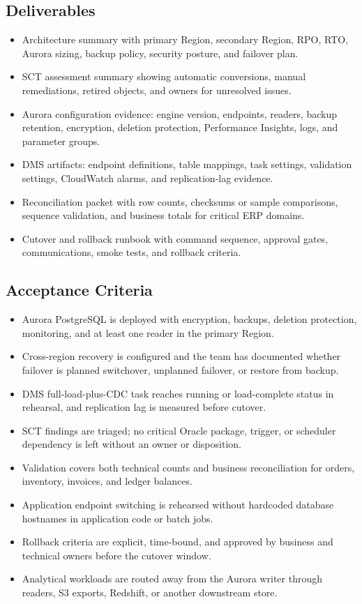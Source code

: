 \subsection*{Deliverables}
\begin{itemize}
    \item Architecture summary with primary Region, secondary Region, RPO, RTO, Aurora sizing, backup policy, security posture, and failover plan.
    \item SCT assessment summary showing automatic conversions, manual remediations, retired objects, and owners for unresolved issues.
    \item Aurora configuration evidence: engine version, endpoints, readers, backup retention, encryption, deletion protection, Performance Insights, logs, and parameter groups.
    \item DMS artifacts: endpoint definitions, table mappings, task settings, validation settings, CloudWatch alarms, and replication-lag evidence.
    \item Reconciliation packet with row counts, checksums or sample comparisons, sequence validation, and business totals for critical ERP domains.
    \item Cutover and rollback runbook with command sequence, approval gates, communications, smoke tests, and rollback criteria.
\end{itemize}

\subsection*{Acceptance Criteria}
\begin{itemize}
    \item Aurora PostgreSQL is deployed with encryption, backups, deletion protection, monitoring, and at least one reader in the primary Region.
    \item Cross-region recovery is configured and the team has documented whether failover is planned switchover, unplanned failover, or restore from backup.
    \item DMS full-load-plus-CDC task reaches running or load-complete status in rehearsal, and replication lag is measured before cutover.
    \item SCT findings are triaged; no critical Oracle package, trigger, or scheduler dependency is left without an owner or disposition.
    \item Validation covers both technical counts and business reconciliation for orders, inventory, invoices, and ledger balances.
    \item Application endpoint switching is rehearsed without hardcoded database hostnames in application code or batch jobs.
    \item Rollback criteria are explicit, time-bound, and approved by business and technical owners before the cutover window.
    \item Analytical workloads are routed away from the Aurora writer through readers, S3 exports, Redshift, or another downstream store.
\end{itemize}

